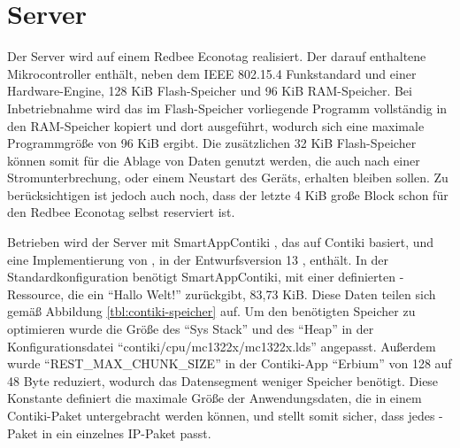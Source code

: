 \section{Server}

Der Server wird auf einem Redbee Econotag \cite{econotag} realisiert. Der darauf enthaltene Mikrocontroller  \cite{mc1322} enthält,
neben dem IEEE 802.15.4 Funkstandard und einer  Hardware-Engine, 128 KiB Flash-Speicher und 96 KiB RAM-Speicher. Bei Inbetriebnahme
wird das im Flash-Speicher vorliegende Programm vollständig in den RAM-Speicher kopiert und dort ausgeführt, wodurch sich eine maximale
Programmgröße von 96 KiB ergibt. Die zusätzlichen 32 KiB Flash-Speicher können somit für die Ablage von Daten genutzt werden, die auch nach einer
Stromunterbrechung, oder einem Neustart des Geräts, erhalten bleiben sollen. Zu berücksichtigen ist jedoch auch noch, dass der letzte 4 KiB große
Block schon für den Redbee Econotag selbst reserviert ist.

Betrieben wird der Server mit SmartAppContiki \cite{erbium}, das auf Contiki \cite{contiki} basiert, und eine Implementierung von , in
der Entwurfsversion 13 \cite{draftcoap13}, enthält. In der Standardkonfiguration benötigt SmartAppContiki, mit einer definierten -Ressource,
die ein "`Hallo Welt!"' zurückgibt, 83,73 KiB. Diese Daten teilen sich gemäß Abbildung \ref{tbl:contiki-speicher} auf. Um den benötigten
Speicher zu optimieren wurde die Größe des "`Sys Stack"' und des "`Heap"' in der Konfigurationsdatei "`contiki/cpu/mc1322x/mc1322x.lds"' angepasst.
Außerdem wurde "`REST\_MAX\_CHUNK\_SIZE"' in der Contiki-App "`Erbium"' von 128 auf 48 Byte reduziert, wodurch das Datensegment weniger Speicher benötigt.
Diese Konstante definiert die maximale Größe der Anwendungsdaten, die in einem Contiki-Paket untergebracht werden können, und stellt somit sicher,
dass jedes -Paket in ein einzelnes IP-Paket passt.

